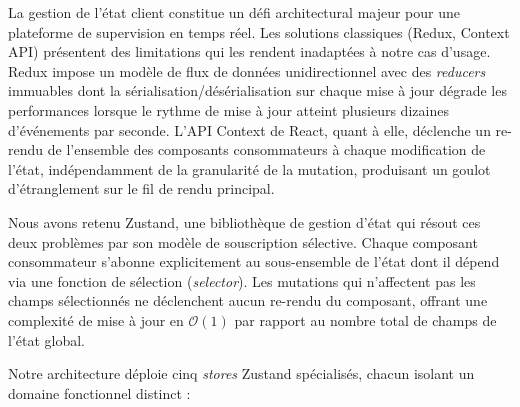 La gestion de l'état client constitue un défi architectural majeur pour une plateforme de supervision en temps réel. Les solutions classiques (Redux, Context API) présentent des limitations qui les rendent inadaptées à notre cas d'usage. Redux impose un modèle de flux de données unidirectionnel avec des \textit{reducers} immuables dont la sérialisation/désérialisation sur chaque mise à jour dégrade les performances lorsque le rythme de mise à jour atteint plusieurs dizaines d'événements par seconde. L'API Context de React, quant à elle, déclenche un re-rendu de l'ensemble des composants consommateurs à chaque modification de l'état, indépendamment de la granularité de la mutation, produisant un goulot d'étranglement sur le fil de rendu principal.

Nous avons retenu Zustand, une bibliothèque de gestion d'état qui résout ces deux problèmes par son modèle de souscription sélective. Chaque composant consommateur s'abonne explicitement au sous-ensemble de l'état dont il dépend via une fonction de sélection (\textit{selector}). Les mutations qui n'affectent pas les champs sélectionnés ne déclenchent aucun re-rendu du composant, offrant une complexité de mise à jour en $\mathcal{O}(1)$ par rapport au nombre total de champs de l'état global.

Notre architecture déploie cinq \textit{stores} Zustand spécialisés, chacun isolant un domaine fonctionnel distinct :

